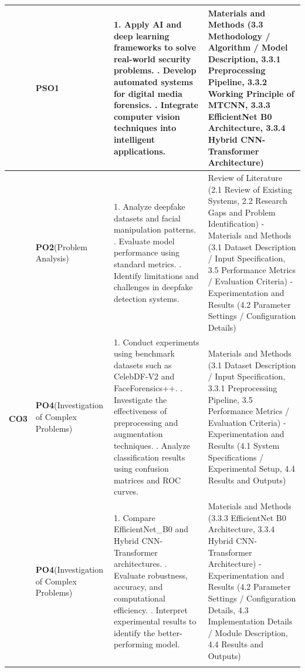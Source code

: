 \documentclass[12pt,a4paper]{report}
\begin{document}
\begin{longtable}{|c|p{2.5cm}|p{7.5cm}|p{4.0cm}|}
& {\textbf{PSO1}}
& 1. Apply AI and deep learning frameworks to solve real-world security problems.
  \newline 2. Develop automated systems for digital media forensics.
  \newline 3. Integrate computer vision techniques into intelligent applications.
& Materials and Methods (3.3 Methodology / Algorithm / Model Description, 3.3.1 Preprocessing Pipeline, 3.3.2 Working Principle of MTCNN, 3.3.3 EfficientNet B0 Architecture, 3.3.4 Hybrid CNN-Transformer Architecture) \\ \hline
\multirow{5}{*}{\textbf{CO3}}
& {\textbf{PO2}\newline(Problem Analysis)}
& 1. Analyze deepfake datasets and facial manipulation patterns.
  \newline 2. Evaluate model performance using standard metrics.
  \newline 3. Identify limitations and challenges in deepfake detection systems.
& Review of Literature (2.1 Review of Existing Systems, 2.2 Research Gaps and Problem Identification) -Materials and Methods (3.1 Dataset Description / Input Specification, 3.5 Performance Metrics / Evaluation Criteria) -Experimentation and Results (4.2 Parameter Settings / Configuration Details) \\ \cline{2-4}

& {\textbf{PO4}\newline(Investigation of Complex Problems)}
& 1. Conduct experiments using benchmark datasets such as CelebDF-V2 and FaceForensics++.
  \newline 2. Investigate the effectiveness of preprocessing and augmentation techniques.
  \newline 3. Analyze classification results using confusion matrices and ROC curves.
& Materials and Methods (3.1 Dataset Description / Input Specification, 3.3.1 Preprocessing Pipeline, 3.5 Performance Metrics / Evaluation Criteria) -Experimentation and Results (4.1 System Specifications / Experimental Setup, 4.4 Results and Outputs) \\ \cline{2-4}

& {\textbf{PO4}\newline(Investigation of Complex Problems)}
& 1. Compare EfficientNet\_B0 and Hybrid CNN-Transformer architectures.
  \newline 2. Evaluate robustness, accuracy, and computational efficiency.
  \newline 3. Interpret experimental results to identify the better-performing model.
& Materials and Methods (3.3.3 EfficientNet B0 Architecture, 3.3.4 Hybrid CNN-Transformer Architecture) -Experimentation and Results (4.2 Parameter Settings / Configuration Details, 4.3 Implementation Details / Module Description, 4.4 Results and Outputs) \\ \cline{2-4}


\end{longtable}
\end{document}
